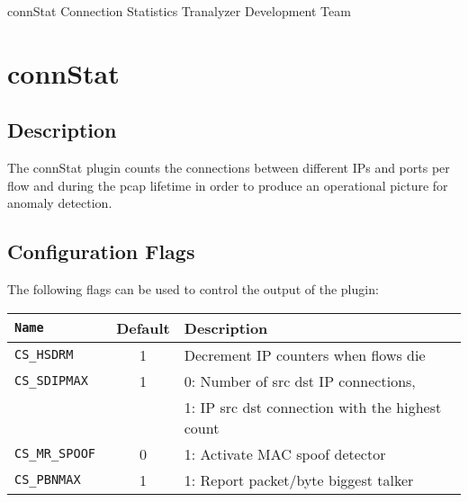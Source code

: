 \documentclass[documentation]{subfiles}
\begin{document}
\trantitle
    {connStat}
    {Connection Statistics}
    {Tranalyzer Development Team} %

\section{connStat}\label{s:connStat}

\subsection{Description}
The connStat plugin counts the connections between different IPs and ports per flow and during the pcap lifetime
in order to produce an operational picture for anomaly detection. %

\subsection{Configuration Flags}
The following flags can be used to control the output of the plugin:
\begin{longtable}{>{\tt}lcl}
    \toprule
    {\bf Name} & {\bf Default} & {\bf Description} \\
    \midrule\endhead%
    CS\_HSDRM     & 1 & Decrement IP counters when flows die \\
    CS\_SDIPMAX   & 1 & 0: Number of src dst IP connections, \\
                  &   & 1: IP src dst connection with the highest count\\
    CS\_MR\_SPOOF & 0 & 1: Activate MAC spoof detector\\
    CS\_PBNMAX    & 1 & 1: Report packet/byte biggest talker\\
    \bottomrule
\end{longtable}
\end{document}
